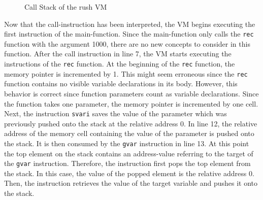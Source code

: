 
\begin{figure}
	\centering
	\caption{Call Stack of the rush VM}\label{fig:rush_vm_call_stack}
\end{figure}

Now that the call-instruction has been interpreted, the VM begins executing the first instruction of the main-function.
Since the main-function only calls the \texttt{rec} function with the argument 1000, there are no new concepts to consider in this function.
After the call instruction in line 7, the VM starts executing the instructions of the \texttt{rec} function.
At the beginning of the \texttt{rec} function, the memory pointer is incremented by 1.
This might seem erroneous since the \texttt{rec} function contains no visible variable declarations in its body.
However, this behavior is correct since function parameters count as variable declarations.
Since the function takes one parameter, the memory pointer is incremented by one cell.
Next, the instruction \texttt{svari} saves the value of the parameter which was previously pushed onto the stack at the relative address 0.
In line 12, the relative address of the memory cell containing the value of the parameter is pushed onto the stack.
It is then consumed by the \texttt{gvar} instruction in line 13.
At this point the top element on the stack contains an address-value referring to the target of the \texttt{gvar} instruction.
Therefore, the instruction first pops the top element from the stack.
In this case, the value of the popped element is the relative address 0.
Then, the instruction retrieves the value of the target variable and pushes it onto the stack.

